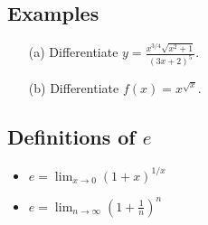 \documentclass[12pt]{book}
\theoremstyle{definition}
\begin{document}
\subsection*{Examples}
\begin{itemize}
    \item[(a)] Differentiate $y=\frac{x^{3/4}\sqrt{x^2+1}}{(3x+2)^5}$.\vspace{4cm}
    \item[(b)] Differentiate $f(x)=x^{\sqrt{x}}$.\vspace{4cm}
\end{itemize}
\begin{tcolorbox}
\subsection*{Definitions of $e$}
\begin{itemize}
    \item $\displaystyle e=\lim_{x\rightarrow 0}(1+x)^{1/x}$
    \item $\displaystyle e=\lim_{n\rightarrow \infty}\left(1+\frac{1}{n}\right)^n$
\end{itemize}
\end{tcolorbox}
\end{document}

